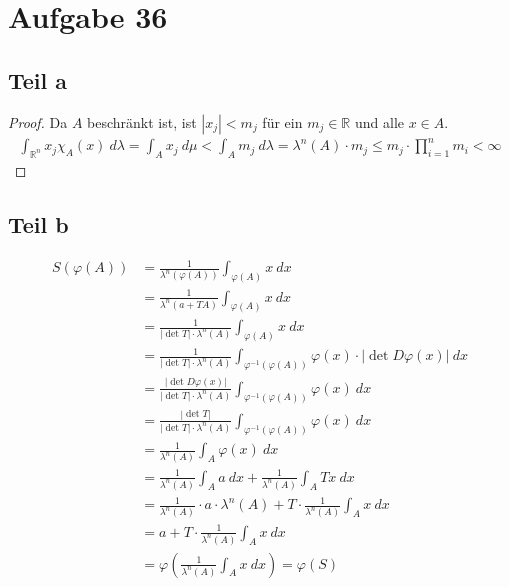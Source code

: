 \documentclass[10pt,a4paper]{article}
\begin{document}
\section{Aufgabe 36}

\subsection{Teil a}
\begin{proof}
  Da $A$ beschränkt ist, ist $|x_{j}| < m_{j}$ für ein $m_{j} \in \mathbb{R}$ und alle $x \in A$.
  \begin{align*}
    \int_{\mathbb{R}^{n}} x_{j} \chi_{A}(x)\ d\lambda = \int_{A} x_{j}\ d\mu < \int_{A} m_{j}\ d\lambda = \lambda^{n}(A) \cdot m_{j} \le m_{j} \cdot \prod_{i = 1}^{n} m_{i} < \infty
  \end{align*}
\end{proof}

\subsection{Teil b}
\begin{align*}
  S(\varphi(A)) & = \frac{1}{\lambda^{n}(\varphi(A))} \int_{\varphi(A)} x\ dx\\
  & = \frac{1}{\lambda^{n}(a + TA)} \int_{\varphi(A)} x\ dx\\
  & = \frac{1}{|\det T| \cdot \lambda^{n}(A)} \int_{\varphi(A)} x\ dx\\
  & = \frac{1}{|\det T| \cdot \lambda^{n}(A)} \int_{\varphi^{-1}(\varphi(A))} \varphi(x) \cdot |\det D\varphi(x)|\ dx\\
  & = \frac{|\det D\varphi(x)|}{|\det T| \cdot \lambda^{n}(A)} \int_{\varphi^{-1}(\varphi(A))} \varphi(x)\ dx\\
  & = \frac{|\det T|}{|\det T| \cdot \lambda^{n}(A)} \int_{\varphi^{-1}(\varphi(A))} \varphi(x)\ dx\\
  & = \frac{1}{\lambda^{n}(A)} \int_{A} \varphi(x)\ dx\\
  & = \frac{1}{\lambda^{n}(A)} \int_{A} a\ dx + \frac{1}{\lambda^{n}(A)} \int_{A} Tx\ dx\\
  & = \frac{1}{\lambda^{n}(A)} \cdot a \cdot \lambda^{n}(A) + T \cdot \frac{1}{\lambda^{n}(A)} \int_{A} x\ dx\\
  & = a + T \cdot \frac{1}{\lambda^{n}(A)} \int_{A} x\ dx\\
  & = \varphi \left(\frac{1}{\lambda^{n}(A)} \int_{A} x\ dx \right) = \varphi(S)
\end{align*}
\end{document}
